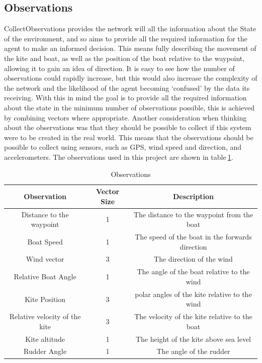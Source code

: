\subsection{Observations}
CollectObservations provides the network will all the information about the State of the environment, and so aims to provide all the required information for the agent to make an informed decision. This means fully describing the movement of the kite and boat, as well as the position of the boat relative to the waypoint, allowing it to gain an idea of direction. It is easy to see how the number of observations could rapidly increase, but this would also increase the complexity of the network and the likelihood of the agent becoming `confused' by the data its receiving. With this in mind the goal is to provide all the required information about the state in the minimum number of observations possible, this is achieved by combining vectors where appropriate. Another consideration when thinking about the observations was that they should be possible to collect if this system were to be created in the real world. This means that the observations should be possible to collect using sensors, such as GPS, wind speed and direction, and accelerometers. The observations used in this project are shown in table$~$\ref{observations}.

\begin{table}[h]
    \centering
    \begin{tabular}{c|c|c}
        Observation & Vector Size & Description \\
        \midrule
        Distance to the waypoint & 1 & The distance to the waypoint from the boat \\
        Boat Speed & 1 & The speed of the boat in the forwards direction \\
        Wind vector & 3 & The direction of the wind \\
        Relative Boat Angle & 1 & The angle of the boat relative to the wind \\
        Kite Position & 3 & polar angles of the kite relative to the wind\\
        Relative velocity of the kite & 3 & The velocity of the kite relative to the boat \\
        Kite altitude & 1 & The height of the kite above sea level \\
        Rudder Angle & 1 & The angle of the rudder \\

        \hline
    \end{tabular}
    \caption{Observations}\label{observations}
\end{table}

